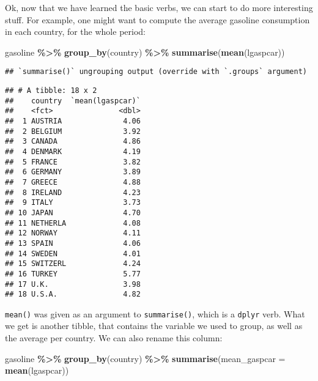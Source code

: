 \documentclass[
]{article}
\newenvironment{Shaded}{\begin{snugshade}}{\end{snugshade}}
\newcommand{\DataTypeTok}[1]{\textcolor[rgb]{0.13,0.29,0.53}{#1}}
\newcommand{\KeywordTok}[1]{\textcolor[rgb]{0.13,0.29,0.53}{\textbf{#1}}}
\newcommand{\NormalTok}[1]{#1}
\newcommand{\OperatorTok}[1]{\textcolor[rgb]{0.81,0.36,0.00}{\textbf{#1}}}
\newcommand{\StringTok}[1]{\textcolor[rgb]{0.31,0.60,0.02}{#1}}
\begin{document}
Ok, now that we have learned the basic verbs, we can start to do more interesting stuff. For
example, one might want to compute the average gasoline consumption in each country, for
the whole period:

\begin{Shaded}
\begin{Highlighting}[]
\NormalTok{gasoline }\OperatorTok{\%\textgreater{}\%}
\StringTok{  }\KeywordTok{group\_by}\NormalTok{(country) }\OperatorTok{\%\textgreater{}\%}
\StringTok{  }\KeywordTok{summarise}\NormalTok{(}\KeywordTok{mean}\NormalTok{(lgaspcar))}
\end{Highlighting}
\end{Shaded}

\begin{verbatim}
## `summarise()` ungrouping output (override with `.groups` argument)
\end{verbatim}

\begin{verbatim}
## # A tibble: 18 x 2
##    country  `mean(lgaspcar)`
##    <fct>               <dbl>
##  1 AUSTRIA              4.06
##  2 BELGIUM              3.92
##  3 CANADA               4.86
##  4 DENMARK              4.19
##  5 FRANCE               3.82
##  6 GERMANY              3.89
##  7 GREECE               4.88
##  8 IRELAND              4.23
##  9 ITALY                3.73
## 10 JAPAN                4.70
## 11 NETHERLA             4.08
## 12 NORWAY               4.11
## 13 SPAIN                4.06
## 14 SWEDEN               4.01
## 15 SWITZERL             4.24
## 16 TURKEY               5.77
## 17 U.K.                 3.98
## 18 U.S.A.               4.82
\end{verbatim}

\texttt{mean()} was given as an argument to \texttt{summarise()}, which is a \texttt{dplyr} verb. What we get is another
tibble, that contains the variable we used to group, as well as the average per country. We can
also rename this column:

\begin{Shaded}
\begin{Highlighting}[]
\NormalTok{gasoline }\OperatorTok{\%\textgreater{}\%}
\StringTok{  }\KeywordTok{group\_by}\NormalTok{(country) }\OperatorTok{\%\textgreater{}\%}
\StringTok{  }\KeywordTok{summarise}\NormalTok{(}\DataTypeTok{mean\_gaspcar =} \KeywordTok{mean}\NormalTok{(lgaspcar))}
\end{Highlighting}
\end{Shaded}
\end{document}
